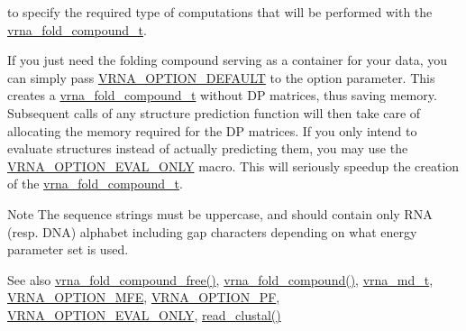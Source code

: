 to specify the required type of computations that will be performed with the \mbox{\hyperlink{group__fold__compound_ga1b0cef17fd40466cef5968eaeeff6166}{vrna\+\_\+fold\+\_\+compound\+\_\+t}}.

If you just need the folding compound serving as a container for your data, you can simply pass \mbox{\hyperlink{group__fold__compound_gacea5b7ee6181c485f36e2afa0e9089e4}{V\+R\+N\+A\+\_\+\+O\+P\+T\+I\+O\+N\+\_\+\+D\+E\+F\+A\+U\+LT}} to the {\ttfamily option} parameter. This creates a \mbox{\hyperlink{group__fold__compound_ga1b0cef17fd40466cef5968eaeeff6166}{vrna\+\_\+fold\+\_\+compound\+\_\+t}} without DP matrices, thus saving memory. Subsequent calls of any structure prediction function will then take care of allocating the memory required for the DP matrices. If you only intend to evaluate structures instead of actually predicting them, you may use the \mbox{\hyperlink{group__fold__compound_ga61469c423131552c8483229f8b6c7e0e}{V\+R\+N\+A\+\_\+\+O\+P\+T\+I\+O\+N\+\_\+\+E\+V\+A\+L\+\_\+\+O\+N\+LY}} macro. This will seriously speedup the creation of the \mbox{\hyperlink{group__fold__compound_ga1b0cef17fd40466cef5968eaeeff6166}{vrna\+\_\+fold\+\_\+compound\+\_\+t}}.

\begin{DoxyNote}{Note}
The sequence strings must be uppercase, and should contain only R\+NA (resp. D\+NA) alphabet including gap characters depending on what energy parameter set is used.
\end{DoxyNote}
\begin{DoxySeeAlso}{See also}
\mbox{\hyperlink{group__fold__compound_gadded6039d63f5d6509836e20321534ad}{vrna\+\_\+fold\+\_\+compound\+\_\+free()}}, \mbox{\hyperlink{group__fold__compound_ga6601d994ba32b11511b36f68b08403be}{vrna\+\_\+fold\+\_\+compound()}}, \mbox{\hyperlink{group__model__details_ga1f8a10e12a0a1915f2a4eff0b28ea17c}{vrna\+\_\+md\+\_\+t}}, \mbox{\hyperlink{group__fold__compound_gae63be9127fe7dcc1f9bb14f5bb1064ee}{V\+R\+N\+A\+\_\+\+O\+P\+T\+I\+O\+N\+\_\+\+M\+FE}}, \mbox{\hyperlink{group__fold__compound_gabfbadcddda3e74ce7f49035ef8f058f7}{V\+R\+N\+A\+\_\+\+O\+P\+T\+I\+O\+N\+\_\+\+PF}}, \mbox{\hyperlink{group__fold__compound_ga61469c423131552c8483229f8b6c7e0e}{V\+R\+N\+A\+\_\+\+O\+P\+T\+I\+O\+N\+\_\+\+E\+V\+A\+L\+\_\+\+O\+N\+LY}}, \mbox{\hyperlink{group__aln__utils_ga1cc88b4df842ca73b4ac0cb5e71c696a}{read\+\_\+clustal()}}
\end{DoxySeeAlso}

